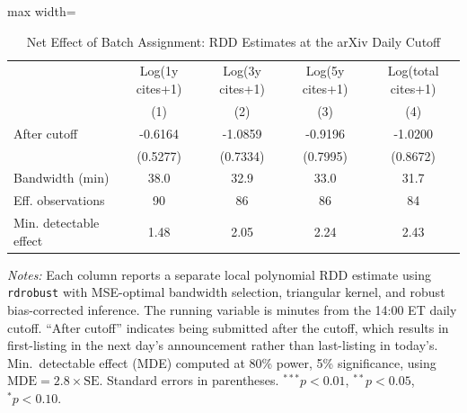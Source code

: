 \begin{table}[htbp]
\centering
\caption{Net Effect of Batch Assignment: RDD Estimates at the arXiv Daily Cutoff}
\label{tab:main}
\begin{adjustbox}{max width=\textwidth}
\begin{tabular}{lcccc}
\hline\hline
& Log(1y cites+1) & Log(3y cites+1) & Log(5y cites+1) & Log(total cites+1) \\
& (1) & (2) & (3) & (4) \\
\hline
After cutoff & -0.6164 & -1.0859 & -0.9196 & -1.0200 \\
& (0.5277) & (0.7334) & (0.7995) & (0.8672) \\
\hline
Bandwidth (min) & 38.0 & 32.9 & 33.0 & 31.7 \\
Eff. observations & 90 & 86 & 86 & 84 \\
Min. detectable effect & 1.48 & 2.05 & 2.24 & 2.43 \\
\hline\hline
\end{tabular}
\end{adjustbox}
\begin{minipage}{0.95\textwidth}
\footnotesize
\textit{Notes:} Each column reports a separate local polynomial RDD estimate using \texttt{rdrobust} with MSE-optimal bandwidth selection, triangular kernel, and robust bias-corrected inference. The running variable is minutes from the 14:00 ET daily cutoff. ``After cutoff'' indicates being submitted after the cutoff, which results in first-listing in the next day's announcement rather than last-listing in today's. Min.\ detectable effect (MDE) computed at 80\% power, 5\% significance, using $\text{MDE} = 2.8 \times \text{SE}$. Standard errors in parentheses. $^{***}p<0.01$, $^{**}p<0.05$, $^{*}p<0.10$.
\end{minipage}
\end{table}
